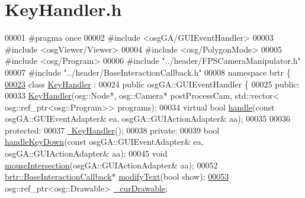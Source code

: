 \hypertarget{_key_handler_8h_source}{\section{Key\+Handler.\+h}
\label{_key_handler_8h_source}
}

\begin{DoxyCode}
00001 \textcolor{preprocessor}{#pragma once}
00002 \textcolor{preprocessor}{#include <osgGA/GUIEventHandler>}
00003 \textcolor{preprocessor}{#include <osgViewer/Viewer>}
00004 \textcolor{preprocessor}{#include <osg/PolygonMode>}
00005 \textcolor{preprocessor}{#include <osg/Program>}
00006 \textcolor{preprocessor}{#include "../header/FPSCameraManipulator.h"}
00007 \textcolor{preprocessor}{#include "../header/BaseInteractionCallback.h"}
00008 \textcolor{keyword}{namespace }brtr \{
\hypertarget{_key_handler_8h_source_l00023}{}\hyperlink{classbrtr_1_1_key_handler}{00023}     \textcolor{keyword}{class }\hyperlink{classbrtr_1_1_key_handler}{KeyHandler} :
00024         \textcolor{keyword}{public} osgGA::GUIEventHandler \{
00025     \textcolor{keyword}{public}:
00033         \hyperlink{classbrtr_1_1_key_handler_aaae067fabc959780a9fae9c700c199da}{KeyHandler}(osg::Node*, osg::Camera* postProcessCam, std::vector<
      osg::ref\_ptr<osg::Program>> programs);
00034         \textcolor{keyword}{virtual} \textcolor{keywordtype}{bool} \hyperlink{classbrtr_1_1_key_handler_a02df9f4339712d5b8b2b25b89048cf47}{handle}(\textcolor{keyword}{const} osgGA::GUIEventAdapter& ea, osgGA::GUIActionAdapter& aa);
00035 
00036     \textcolor{keyword}{protected}:
00037         \hyperlink{classbrtr_1_1_key_handler_aabad0b142ba1d2e648069b4e8af17797}{~KeyHandler}();
00038     \textcolor{keyword}{private}:
00039         \textcolor{keywordtype}{bool} \hyperlink{classbrtr_1_1_key_handler_a5af6a6e66e8754591b3425addc6e6858}{handleKeyDown}(\textcolor{keyword}{const} osgGA::GUIEventAdapter& ea, osgGA::GUIActionAdapter& aa);
00045         \textcolor{keywordtype}{void} \hyperlink{classbrtr_1_1_key_handler_a7f402d48b863ed19ef47038a32d1d05c}{mouseIntersection}(osgGA::GUIActionAdapter& aa);
00052         \hyperlink{classbrtr_1_1_base_interaction_callback}{brtr::BaseInteractionCallback}* \hyperlink{classbrtr_1_1_key_handler_a1925fa114839192716167477714abfdc}{modifyText}(\textcolor{keywordtype}{bool} show);
\hypertarget{_key_handler_8h_source_l00053}{}\hyperlink{classbrtr_1_1_key_handler_a4b0e380186a8172af6cf7c10dcff675a}{00053}         osg::ref\_ptr<osg::Drawable> \hyperlink{classbrtr_1_1_key_handler_a4b0e380186a8172af6cf7c10dcff675a}{\_curDrawable};

\end{DoxyCode}
